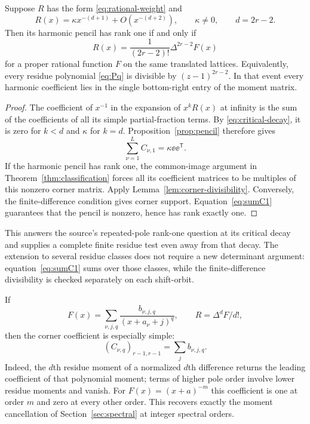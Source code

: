 \begin{theorem}
\label{thm:critical}
Suppose $R$ has the form \eqref{eq:rational-weight} and
\begin{equation}\label{eq:critical-decay}
 R(x)=\kappa x^{-(d+1)}+O(x^{-(d+2)}),\qquad\kappa\ne0,
 \qquad d=2r-2.
\end{equation}
Then its harmonic pencil has rank one if and only if
\begin{equation}\label{eq:critical-difference}
 \boxed{\displaystyle R(x)=\frac1{(2r-2)!}\Delta^{2r-2}F(x)}
\end{equation}
for a proper rational function $F$ on the same translated lattices.
Equivalently, every residue polynomial \eqref{eq:Pq} is divisible
by $(z-1)^{2r-2}$. In that event every harmonic coefficient lies in
the single bottom-right entry of the moment matrix.
\end{theorem}
\begin{proof}
The coefficient of $x^{-1}$ in the expansion of $x^kR(x)$ at infinity
is the sum of the coefficients of all its simple partial-fraction
terms. By \eqref{eq:critical-decay}, it is zero for $k<d$ and
$\kappa$ for $k=d$. Proposition~\ref{prop:pencil} therefore gives
\begin{equation}\label{eq:sumC1}
 \sum_{\nu=1}^L C_{\nu,1}=\kappa\ee\ee^{\mathsf T}.
\end{equation}
If the harmonic pencil has rank one, the common-image argument in
Theorem~\ref{thm:classification} forces all its coefficient matrices
to be multiples of this nonzero corner matrix. Apply
Lemma~\ref{lem:corner-divisibility}. Conversely, the finite-difference
condition gives corner support. Equation~\eqref{eq:sumC1} guarantees
that the pencil is nonzero, hence has rank exactly one.
\end{proof}

This answers the source's repeated-pole rank-one question at its
critical decay and supplies a complete finite residue test even away
from that decay. The extension to several residue classes does not
require a new determinant argument: equation~\eqref{eq:sumC1} sums
over those classes, while the finite-difference divisibility is checked
separately on each shift-orbit.

If
\[
 F(x)=\sum_{\nu,j,q}\frac{b_{\nu,j,q}}{(x+a_\nu+j)^q},
 \qquad R=\Delta^dF/d!,
\]
then the corner coefficient is especially simple:
\begin{equation}\label{eq:lambda-seed}
 (C_{\nu,q})_{r-1,r-1}=\sum_j b_{\nu,j,q}.
\end{equation}
Indeed, the $d$th residue moment of a normalized $d$th difference
returns the leading coefficient of that polynomial moment; terms
of higher pole order involve lower residue moments and vanish.
For $F(x)=(x+a)^{-m}$ this coefficient is one at order $m$ and zero
at every other order. This recovers exactly the moment cancellation
of Section~\ref{sec:spectral} at integer spectral orders.

